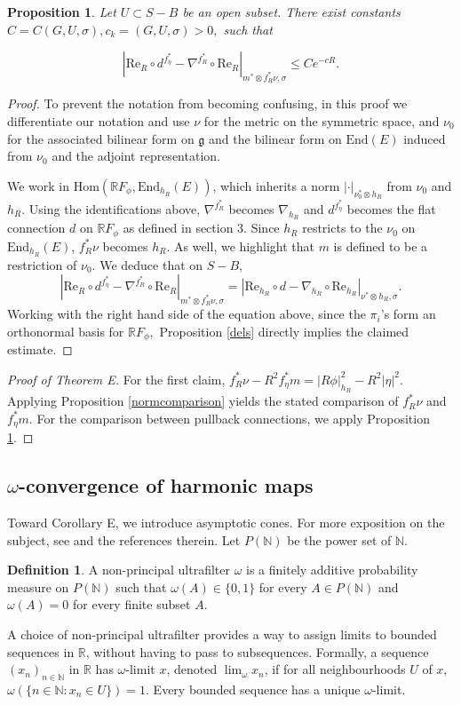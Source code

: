 \documentclass[10pt]{amsart}
\newcommand{\R}{\mathbb R}
\newcommand{\N}{\mathbb N}
\newcommand{\g}{\mathfrak{g}}
\newtheorem{prop}[thm]{Proposition}
\theoremstyle{definition}
\newtheorem{defn}[thm]{Definition}
\begin{document}
\begin{prop}\label{prop:thmE2ndpart}
    Let $U\subset S-B$ be an open subset. There exist constants $C=C(G, U, \sigma), c_k=(G,U,\sigma)>0,$ such that

$$    |\textrm{Re}_R \circ d^{f_\eta^*}-\nabla^{f_R^*}  \circ \textrm{Re}_R|_{m^*\otimes f_R^*\nu,\sigma}\leq Ce^{-cR}.$$
\end{prop}
\begin{proof}
To prevent the notation from becoming confusing, in this proof we differentiate our notation and use $\nu$ for the metric on the symmetric space, and $\nu_0$ for the associated bilinear form on $\g$ and the bilinear form on $\textrm{End}(E)$ induced from $\nu_0$ and the adjoint representation.

We work in $\textrm{Hom}(\R F_\phi,\textrm{End}_{h_R}(E))$, which inherits a norm $|\cdot|_{\nu_0^*\otimes h_R}$ from $\nu_0$ and $h_R$. Using the identifications above, $\nabla^{f_R^*}$ becomes $\nabla_{h_R}$ and $d^{f_\eta^*}$ becomes the flat connection $d$ on $\R F_\phi$ as defined in section 3. Since $h_R$ restricts to the $\nu_0$ on $\textrm{End}_{h_R}(E)$, $f_R^*\nu$ becomes $h_R$. As well, we highlight that $m$ is defined to be a restriction of $\nu_0$.
We deduce that on $S-B$, $$ |\textrm{Re}_R \circ d^{f_\eta^*}-\nabla^{f_R^*}  \circ \textrm{Re}_R|_{m^*\otimes f_R^*\nu,\sigma}=|\textrm{Re}_{h_R}\circ d-\nabla_{h_R}\circ \textrm{Re}_{h_R}|_{\nu^*\otimes h_R,\sigma}.$$
    Working with the right hand side of the equation above, since the $\pi_i$'s form an orthonormal basis for $\R F_\phi,$ Proposition \ref{dels} directly implies the claimed estimate.
\end{proof}

\begin{proof}[Proof of Theorem E]
For the first claim,
$f_R^*\nu-R^2f_\eta^*m= |R\phi|_{h_R}^2 - R^2|\eta|^2.$ Applying Proposition \ref{normcomparison} yields the stated comparison of $f_R^*\nu$ and $f_\eta^*m$. For the comparison between pullback connections, we apply Proposition \ref{prop:thmE2ndpart}. 
\end{proof}


\subsection{$\omega$-convergence of harmonic maps}
Toward Corollary E, we introduce asymptotic cones. For more exposition on the subject, see \cite{KL} and the references therein. Let $P(\mathbb{N})$ be the power set of $\mathbb{N}$. 
\begin{defn}
    A non-principal ultrafilter $\omega$ is a finitely additive probability measure on $P(\mathbb{N})$ such that $\omega(A)\in \{0,1\}$ for every $A\in P(\N)$ and $\omega(A)=0$ for every finite subset $A.$
\end{defn}
A choice of non-principal ultrafilter provides a way to assign limits to bounded sequences in $\R$, without having to pass to subsequences. Formally, a sequence $(x_n)_{n\in \N}$ in $\R$ has $\omega$-limit $x$, denoted $\lim_\omega x_n$, if for all neighbourhoods $U$ of $x,$ $\omega(\{n\in \N: x_n\in U\})=1.$ Every bounded sequence has a unique $\omega$-limit.
\end{document}
